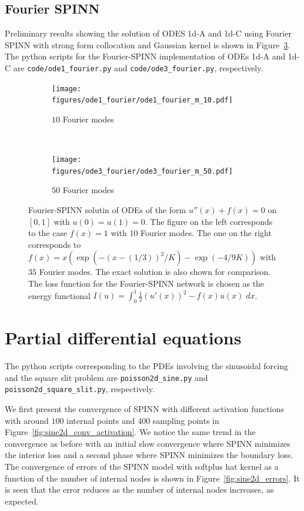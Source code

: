 \documentclass[12pt]{article}
\begin{document}
\subsection{Fourier SPINN}
\label{app:fourier_spinn}

Preliminary results showing the solution of ODES 1d-A and 1d-C using Fourier SPINN with strong form collocation and Gaussian kernel is shown in Figure~\ref{fig:fourier_spinn_1d}. The python scripts for the Fourier-SPINN implementation of ODEs 1d-A and 1d-C are \verb|code/ode1_fourier.py| and \verb|code/ode3_fourier.py|, respectively.

\begin{figure}
\begin{subfigure}{0.5\textwidth}
\texttt{[image: figures/ode1\_fourier/ode1\_fourier\_m\_10.pdf]}
\caption{$10$ Fourier modes}
\label{fig:fourier_spinn_1d_basic}
\end{subfigure}
~
\begin{subfigure}{0.5\textwidth}
\texttt{[image: figures/ode3\_fourier/ode3\_fourier\_m\_50.pdf]}
\caption{$50$ Fourier modes}
\label{fig:fourier_spinn_1d_bump}
\end{subfigure}
\caption{Fourier-SPINN solutin of ODEs of the form $u''(x) + f(x) = 0$ on $[0,1]$ with $u(0) = u(1) = 0$. The figure on the left corresponds to the case $f(x) = 1$ with $10$ Fourier modes. The one on the right corresponds to $f(x) = x(\exp (-(x - (1/3))^2/K) - \exp (-4/9K))$ with $35$ Fourier modes. The exact solution is also shown for comparison. The loss function for the Fourier-SPINN network is chosen as the energy functional $I(u) = \int_0^1 \frac{1}{2}(u'(x))^2 - f(x)u(x) \; dx$.}
\label{fig:fourier_spinn_1d}
\end{figure}

\section{Partial differential equations} \label{app:pde}
The python scripts corresponding to the PDEs involving the sinusoidal forcing and the square slit problem are \verb|poisson2d_sine.py| and \verb|poisson2d_square_slit.py|, respectively.

We first present the convergence of SPINN with different activation functions with around $100$ internal points and $400$ sampling points in Figure~\ref{fig:sine2d_conv_activation}. We notice the same trend in the convergence as before with an initial slow convergence where SPINN minimizes the interior loss and a second phase where SPINN minimizes the boundary loss. The convergence of errors of the SPINN model with softplus hat kernel as a function of the number of internal nodes is shown in Figure~\ref{fig:sine2d_errors}. It is seen that the error reduces as the number of internal nodes increases, as expected.
\end{document}
